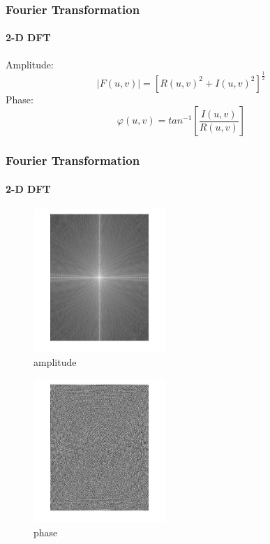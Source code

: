 \documentclass[11 pt,t]{beamer}
\begin{document}
\begin{frame}
\frametitle{Fourier Transformation}
\framesubtitle{2-D DFT}
Amplitude:\\
$$\mid F(u,v)\mid =[R(u,v)^{2}+I(u,v)^{2}]^\frac{1}{2}$$
Phase:\\
$$\varphi (u,v)=tan^{-1}[\frac{I(u,v)}{R(u,v)}]$$
\end{frame}

\begin{frame}
\frametitle{Fourier Transformation}
\framesubtitle{2-D DFT}
\begin{minipage}[t]{0.4\linewidth}
\begin{figure}
   \includegraphics[width=5cm]{amplitude}
\caption{amplitude}
 \end{figure}
        \end{minipage}
\begin{minipage}[t]{0.4\linewidth}
\begin{figure}
   \includegraphics[width=5cm]{phase}
\caption{phase}
 \end{figure}
        \end{minipage}
\end{frame}
\end{document}

